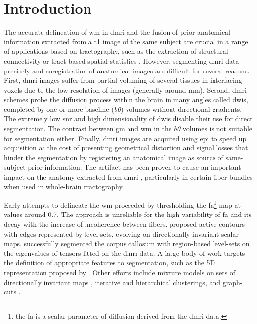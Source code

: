 \section{Introduction}\label{sec:introduction}
The accurate delineation of \gls*{wm} in \gls*{dmri} and the fusion of prior
  anatomical information extracted from a \gls*{t1} image of the same subject
  are crucial in a range of applications based on tractography, such as
  the extraction of structural connectivity \citep{craddock_imaging_2013} or
  tract-based spatial statistics \citep{smith_tractbased_2006}.
However, segmenting \gls*{dmri} data precisely and coregistration of anatomical
  images are difficult for several reasons.
First, \gls{dmri} images suffer from partial voluming of several tissues in 
  interfacing voxels due to the low resolution of images (generally around
  mm).
Second, \gls*{dmri} schemes probe the diffusion process within the brain in 
  many angles called \glspl*{dwi}, completed by one or more baseline (\emph{b0}) 
  volumes without directional gradients.
The extremely low \gls*{snr} and high dimensionality of \glspl*{dwi} disable their
  use for direct segmentation.
The contrast between \gls*{gm} and \gls*{wm} in the \emph{b0} volumes is not suitable for 
  segmentation either.
Finally, \gls*{dmri} images are acquired using \gls*{epi} to speed up acquisition
  at the cost of presenting geometrical distortion and 
  signal losses \citep{jezzard_correction_1995} that hinder the segmentation by
  registering an anatomical image as source of same-subject prior information.
The artifact has been proven to cause an important impact on the anatomy extracted
  from \gls*{dmri} \citep{irfanoglu_effects_2012}, particularly in certain fiber bundles
  when used in whole-brain tractography.

Early attempts to delineate the \gls*{wm} proceeded by thresholding the 
  \gls*{fa}\footnote{the \gls*{fa} is a scalar parameter of diffusion derived from
  the \gls*{dmri} data.} map at values around 0.7.
The approach is unreliable for the high variability of \gls*{fa} and its
  decay with the increase of incoherence between fibers.
\cite{zhukov_level_2003} proposed active contours with edges represented
  by level sets, evolving on directionally invariant scalar maps.
\cite{rousson_level_2004} successfully segmented the corpus callosum with
  region-based level-sets on the eigenvalues of tensors fitted on the
  \gls*{dmri} data.
A large body of work targets the definition of appropriate features to segmentation,
  such as the 5D representation proposed by \cite{jonasson_segmentation_2005}.
Other efforts include mixture models on sets of directionally invariant maps
  \citep{liu_brain_2007}, iterative \citep{hadjiprocopis_unbiased_2005} and
  hierarchical \citep{lu_segmentation_2008} clusterings,
  and graph-cuts \citep{han_experimental_2009}.
 
